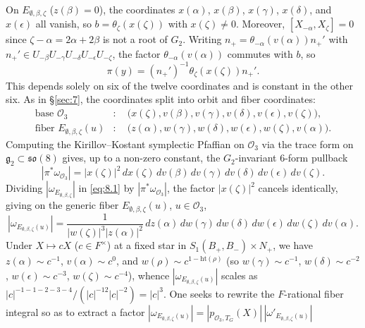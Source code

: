 \documentclass[12pt,letterpaper]{amsart}
\theoremstyle{plain}
\theoremstyle{definition}
\theoremstyle{remark}
\theoremstyle{definition}
\begin{document}
On $E_{\emptyset,\beta,\zeta}$ ($z(\beta)=0$), the coordinates $x(\alpha)$,
$x(\beta)$, $x(\gamma)$, $x(\delta)$, and $x(\epsilon)$ all vanish, so
$b=\theta_\zeta(x(\zeta))$ with $x(\zeta)\neq0$. Moreover, $[X_{-\alpha},X_\zeta]=0$
since $\zeta-\alpha=2\alpha+2\beta$ is not a root of $G_2$. Writing
$n_+=\theta_{-\alpha}(v(\alpha))n_+'$ with
$n_+'\in U_{-\beta}U_{-\gamma}U_{-\delta}U_{-\epsilon}U_{-\zeta}$, the factor
$\theta_{-\alpha}(v(\alpha))$ commutes with $b$, so
\[
\pi(y)=(n_+')^{-1}\theta_\zeta(x(\zeta))n_+'.
\]
This depends solely on six of the twelve coordinates and is constant in the
other six. As in \S\ref{sec:7}, the coordinates split into orbit and fiber
coordinates:
\begin{align*}
\text{base }{\mathcal O}_3&:\quad
\bigl(x(\zeta),v(\beta),v(\gamma),v(\delta),v(\epsilon),v(\zeta)\bigr),\\
\text{fiber }E_{\emptyset,\beta,\zeta}(u)&:\quad
\bigl(z(\alpha),w(\gamma),w(\delta),w(\epsilon),w(\zeta),v(\alpha)\bigr).
\end{align*}
Computing the Kirillov--Kostant symplectic Pfaffian on ${\mathcal O}_3$ via the
trace form on $\mathfrak g_2\subset\mathfrak{so}(8)$ gives, up to a non-zero
constant, the $G_2$-invariant $6$-form pullback
\begin{equation}\tag{8.4}\label{eq:8.4}
|\pi^*\omega_{{\mathcal O}_3}|
=|x(\zeta)|^2\,dx(\zeta)\,dv(\beta)\,dv(\gamma)\,dv(\delta)\,dv(\epsilon)\,dv(\zeta).
\end{equation}
Dividing $|\omega_{E_{\emptyset,\beta,\zeta}}|$ in \eqref{eq:8.1} by
$|\pi^*\omega_{{\mathcal O}_3}|$, the factor $|x(\zeta)|^2$ cancels identically,
giving on the generic fiber $E_{\emptyset,\beta,\zeta}(u)$, $u\in {\mathcal O}_3$,
\begin{equation}\tag{8.5}\label{eq:8.5}
|\omega_{E_{\emptyset,\beta,\zeta}(u)}|=
\frac{1}{|w(\zeta)|^3|z(\alpha)|^2}\,
dz(\alpha)\,dw(\gamma)\,dw(\delta)\,dw(\epsilon)\,dw(\zeta)\,dv(\alpha).
\end{equation}
Under $X\mapsto cX$ ($c\in F^\times$) at a fixed star in $S_1(B_+,B_-)\times N_+$,
we have $z(\alpha)\sim c^{-1}$, $v(\alpha)\sim c^0$, and $w(\rho)\sim c^{1-\mathrm{ht}(\rho)}$
(so $w(\gamma)\sim c^{-1}$, $w(\delta)\sim c^{-2}$, $w(\epsilon)\sim c^{-3}$,
$w(\zeta)\sim c^{-4}$), whence $|\omega_{E_{\emptyset,\beta,\zeta}(u)}|$ scales
as $|c|^{-1-1-2-3-4}/(|c|^{-12}|c|^{-2})=|c|^3$. One seeks to rewrite the
$F$-rational fiber integral so as to extract a factor
$|\omega_{E_{\emptyset,\beta,\zeta}(u)}|=
|p_{{\mathcal O}_3,T_G}(X)|\,|\omega'_{E_{\emptyset,\beta,\zeta}(u)}|$
\end{document}
